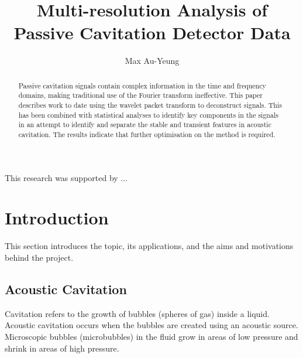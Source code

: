 \documentclass[reprint,NumberedRefs]{JASA}
\begin{document}
\title[]{Multi-resolution Analysis of Passive Cavitation Detector Data}

\author{Max Au-Yeung}



\altaffiliation{}


\begin{abstract}
Passive cavitation signals contain complex information in the time and frequency domains, making traditional use of the Fourier transform ineffective. This paper describes work to date using the wavelet packet transform to deconstruct signals. This has been combined with statistical analyses to identify key components in the signals in an attempt to identify and separate the stable and transient features in acoustic cavitation. The results indicate that further optimisation on the method is required.
\end{abstract}

\maketitle


\begin{acknowledgments}
This research was supported by ...
\end{acknowledgments}

\section{Introduction}
\label{sec:intro}

This section introduces the topic, its applications, and the aims and motivations behind the project.

\subsection{Acoustic Cavitation}

Cavitation refers to the growth of bubbles (spheres of gas) inside a liquid. Acoustic cavitation occurs when the bubbles are created using an acoustic source. Microscopic bubbles (microbubbles) in the fluid grow in areas of low pressure and shrink in areas of high pressure.
\end{document}
